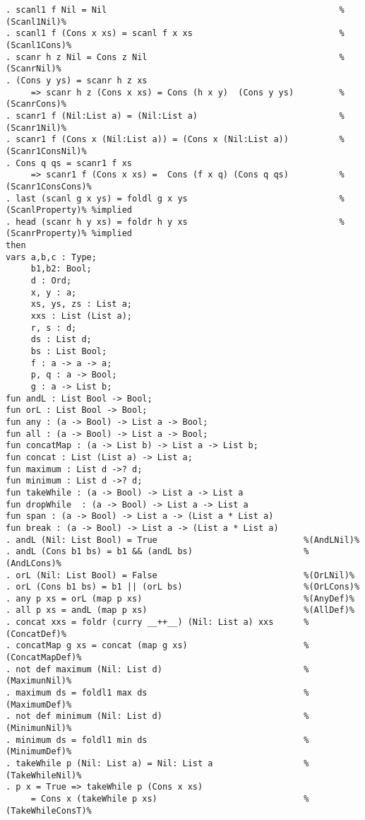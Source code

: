 \begin{Verbatim}
. scanl1 f Nil = Nil                                              %(Scanl1Nil)%
. scanl1 f (Cons x xs) = scanl f x xs                             %(Scanl1Cons)%
. scanr h z Nil = Cons z Nil                                      %(ScanrNil)%
. (Cons y ys) = scanr h z xs
     => scanr h z (Cons x xs) = Cons (h x y)  (Cons y ys)         %(ScanrCons)%
. scanr1 f (Nil:List a) = (Nil:List a)                            %(Scanr1Nil)%
. scanr1 f (Cons x (Nil:List a)) = (Cons x (Nil:List a))          %(Scanr1ConsNil)%
. Cons q qs = scanr1 f xs  
     => scanr1 f (Cons x xs) =  Cons (f x q) (Cons q qs)          %(Scanr1ConsCons)%
. last (scanl g x ys) = foldl g x ys                              %(ScanlProperty)% %implied
. head (scanr h y xs) = foldr h y xs                              %(ScanrProperty)% %implied
then
vars a,b,c : Type;
     b1,b2: Bool;
     d : Ord;
     x, y : a;
     xs, ys, zs : List a;
     xxs : List (List a);
     r, s : d;
     ds : List d;
     bs : List Bool;
     f : a -> a -> a;
     p, q : a -> Bool;
     g : a -> List b;
fun andL : List Bool -> Bool;
fun orL : List Bool -> Bool;
fun any : (a -> Bool) -> List a -> Bool;
fun all : (a -> Bool) -> List a -> Bool;
fun concatMap : (a -> List b) -> List a -> List b;
fun concat : List (List a) -> List a;
fun maximum : List d ->? d;
fun minimum : List d ->? d;
fun takeWhile : (a -> Bool) -> List a -> List a
fun dropWhile  : (a -> Bool) -> List a -> List a
fun span : (a -> Bool) -> List a -> (List a * List a)
fun break : (a -> Bool) -> List a -> (List a * List a)
. andL (Nil: List Bool) = True                             %(AndLNil)%
. andL (Cons b1 bs) = b1 && (andL bs)                      %(AndLCons)%
. orL (Nil: List Bool) = False                             %(OrLNil)%
. orL (Cons b1 bs) = b1 || (orL bs)                        %(OrLCons)%
. any p xs = orL (map p xs)                                %(AnyDef)%
. all p xs = andL (map p xs)                               %(AllDef)%
. concat xxs = foldr (curry __++__) (Nil: List a) xxs      %(ConcatDef)%
. concatMap g xs = concat (map g xs)                       %(ConcatMapDef)%
. not def maximum (Nil: List d)                            %(MaximunNil)%
. maximum ds = foldl1 max ds                               %(MaximumDef)%
. not def minimum (Nil: List d)                            %(MinimunNil)%
. minimum ds = foldl1 min ds                               %(MinimumDef)%
. takeWhile p (Nil: List a) = Nil: List a                  %(TakeWhileNil)%
. p x = True => takeWhile p (Cons x xs) 
     = Cons x (takeWhile p xs)                             %(TakeWhileConsT)%

\end{Verbatim}
